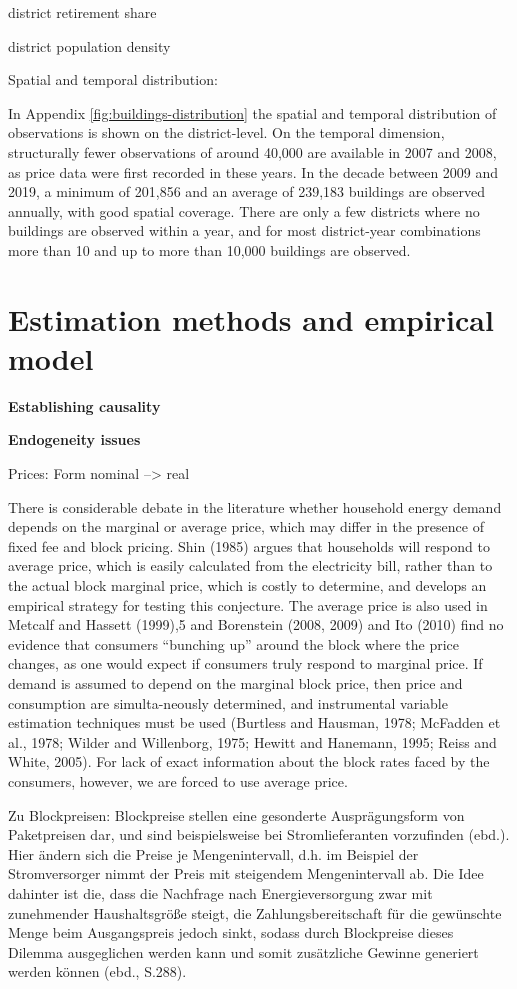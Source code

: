 \documentclass[12pt,twoside]{reedthesis}
\begin{document}
district retirement share

district population density

Spatial and temporal distribution:

In Appendix \ref{fig:buildings-distribution} the spatial and temporal distribution of observations is shown on the district-level. On the temporal dimension, structurally fewer observations of around 40,000 are available in 2007 and 2008, as price data were first recorded in these years. In the decade between 2009 and 2019, a minimum of 201,856 and an average of 239,183 buildings are observed annually, with good spatial coverage. There are only a few districts where no buildings are observed within a year, and for most district-year combinations more than 10 and up to more than 10,000 buildings are observed.

\hypertarget{empirical_model}{%
\section{Estimation methods and empirical model}\label{empirical_model}}

\textbf{Establishing causality}

\textbf{Endogeneity issues}

Prices: Form nominal --\textgreater{} real

There is considerable debate in the literature whether household energy demand depends on the marginal or average price, which may differ in the presence of fixed fee and block pricing. Shin (1985) argues that households will respond to average price, which is easily calculated from the electricity bill, rather than to the actual block marginal price, which is costly to determine, and develops an empirical strategy for testing this conjecture. The average price is also used in Metcalf and Hassett (1999),5 and Borenstein (2008, 2009) and Ito (2010) find no evidence that consumers ``bunching up'' around the block where the price changes, as one would expect if consumers truly respond to marginal price. If demand is assumed to depend on the marginal block price, then price and consumption are simulta-neously determined, and instrumental variable estimation techniques must be used (Burtless and Hausman, 1978; McFadden et al., 1978; Wilder and Willenborg, 1975; Hewitt and Hanemann, 1995; Reiss and White, 2005).
For lack of exact information about the block rates faced by the consumers, however, we are forced to use average price.

Zu Blockpreisen:
Blockpreise stellen eine gesonderte Ausprägungsform von Paketpreisen dar, und sind beispielsweise bei Stromlieferanten vorzufinden (ebd.). Hier ändern sich die Preise je Mengenintervall, d.h. im Beispiel der Stromversorger nimmt der Preis mit steigendem Mengenintervall ab. Die Idee dahinter ist die, dass die Nachfrage nach Energieversorgung zwar mit zunehmender Haushaltsgröße steigt, die Zahlungsbereitschaft für die gewünschte Menge beim Ausgangspreis jedoch sinkt, sodass durch Blockpreise dieses Dilemma ausgeglichen werden kann und somit zusätzliche Gewinne generiert werden können (ebd., S.288).
\end{document}
